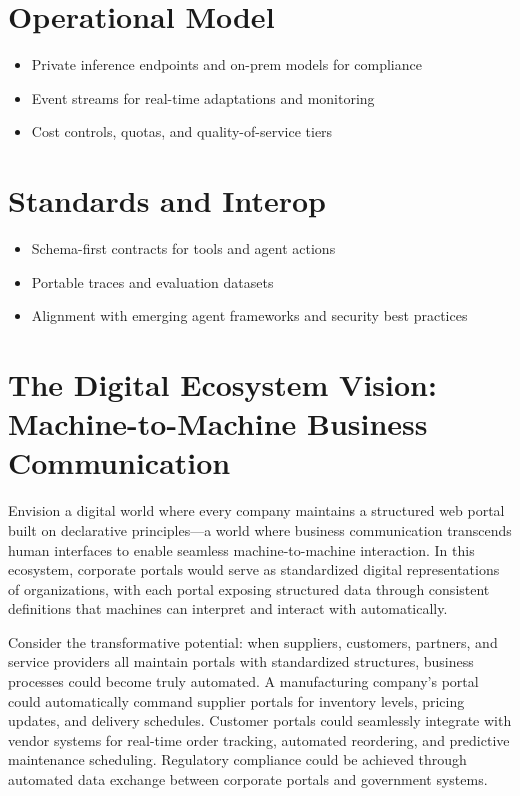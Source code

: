 \section{Operational Model}
\begin{itemize}
	\item Private inference endpoints and on-prem models for compliance
	\item Event streams for real-time adaptations and monitoring
	\item Cost controls, quotas, and quality-of-service tiers
\end{itemize}

\section{Standards and Interop}
\begin{itemize}
	\item Schema-first contracts for tools and agent actions
	\item Portable traces and evaluation datasets
	\item Alignment with emerging agent frameworks and security best practices
\end{itemize}

\section{The Digital Ecosystem Vision: Machine-to-Machine Business Communication}
\label{sec:digital-ecosystem-vision}

Envision a digital world where every company maintains a structured web portal built on declarative principles—a world where business communication transcends human interfaces to enable seamless machine-to-machine interaction. In this ecosystem, corporate portals would serve as standardized digital representations of organizations, with each portal exposing structured data through consistent \wbdl{} definitions that machines can interpret and interact with automatically.

Consider the transformative potential: when suppliers, customers, partners, and service providers all maintain portals with standardized structures, business processes could become truly automated. A manufacturing company's portal could automatically command supplier portals for inventory levels, pricing updates, and delivery schedules. Customer portals could seamlessly integrate with vendor systems for real-time order tracking, automated reordering, and predictive maintenance scheduling. Regulatory compliance could be achieved through automated data exchange between corporate portals and government systems.

